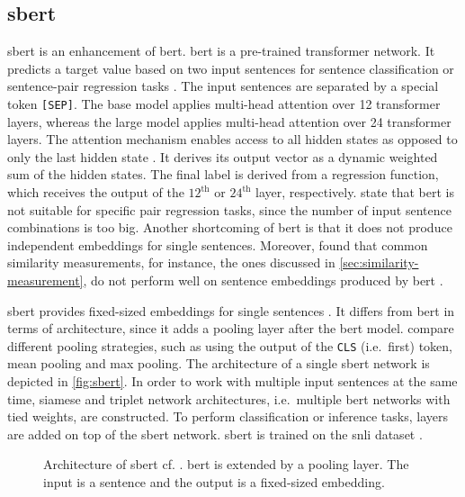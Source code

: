 \subsection{\acl*{sbert}}\label{subsec:hf-sent-ransformers}

\acf{sbert} is an enhancement of \ac{bert}.
\ac{bert} is a pre-trained transformer network.
It predicts a target value based on two input sentences for sentence classification or sentence-pair regression tasks \cite{HfsentTrans2019}.
The input sentences are separated by a special token \texttt{[SEP]}.
The base model applies multi-head attention over 12 transformer layers, whereas the large model applies multi-head attention over 24 transformer layers.
The attention mechanism enables access to all hidden states as opposed to only the last hidden state \cite{attention_book2023}.
It derives its output vector as a dynamic weighted sum of the hidden states.
The final label is derived from a regression function, which receives the output of the $12^\text{th}$ or $24^\text{th}$ layer, respectively.
\citeauthor{HfsentTrans2019} state that \ac{bert} is not suitable for specific pair regression tasks, 
since the number of input sentence combinations is too big.
Another shortcoming of \ac{bert} is that it does not produce independent embeddings for single sentences.
Moreover, \citeauthor{HfsentTrans2019} found that common similarity measurements, for instance, the ones discussed in \autoref{sec:similarity-measurement}, 
do not perform well on sentence embeddings produced by \ac{bert} \cite{HfsentTrans2019}.

\ac{sbert} provides fixed-sized embeddings for single sentences \cite{HfsentTrans2019}.
It differs from \ac{bert} in terms of architecture, since it adds a pooling layer after the \ac{bert} model.
\citeauthor{HfsentTrans2019} compare different pooling strategies, such as using the output of the \texttt{CLS} (i.e.\ first) token, mean pooling and max pooling.
The architecture of a single \ac{sbert} network is depicted in \autoref{fig:sbert}.
In order to work with multiple input sentences at the same time, siamese and triplet network architectures, 
i.e.\ multiple \ac{bert} networks with tied weights, are constructed.
To perform classification or inference tasks, layers are added on top of the \ac{sbert} network.
\ac{sbert} is trained on the \ac{snli} dataset \cite{HfsentTrans2019, snli_dataset}.

\begin{figure}[!htb] %
    \centering
    
    \caption[Architecture of \acs*{sbert}]{Architecture of \acs*{sbert} cf. \cite{HfsentTrans2019}.
    \acs*{bert} is extended by a pooling layer.
    The input is a sentence and the output is a fixed-sized embedding.
    }
    \label{fig:sbert}
\end{figure}

